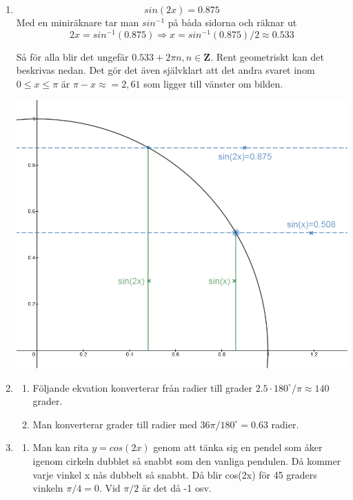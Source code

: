 \documentclass[a4paper,12pt]{article}
\begin{document}
\begin{enumerate}
      \item $$sin(2x)=0.875$$
            Med en miniräknare tar man $sin^{-1}$ på båda sidorna och räknar ut
            $$2x=sin^{-1}(0.875)\Rightarrow x=sin^{-1}(0.875)/2\approx 0.533$$

            Så för alla blir det ungefär $0.533+2\pi n, n\in \mathbf{Z}$.
            Rent geometriskt kan det beskrivas nedan.
            Det gör det även självklart
            att det andra svaret inom $0 \leq x \leq \pi$ är $\pi-x\approx=2,61$ som ligger till vänster om bilden.

            \includegraphics[scale=0.5]{Figur1.png}

      \item
            \begin{enumerate}
                  \item Följande ekvation konverterar från radier till grader $2.5\cdot180^\circ/\pi\approx 140$ grader.

                  \item Man konverterar grader till radier med $36\pi/180^\circ=0.63$ radier.
            \end{enumerate}

      \item
            \begin{enumerate}
                  \item Man kan rita $y=cos(2x)$ genom att tänka sig en pendel som åker igenom cirkeln dubblet
                        så snabbt som den vanliga pendulen. Då kommer varje vinkel x nås dubbelt så snabbt. Då blir
                        cos(2x) för 45 graders vinkeln $\pi/4=0$. Vid $\pi/2$ är det då -1 osv.


\end{enumerate}
\end{enumerate}
\end{document}
